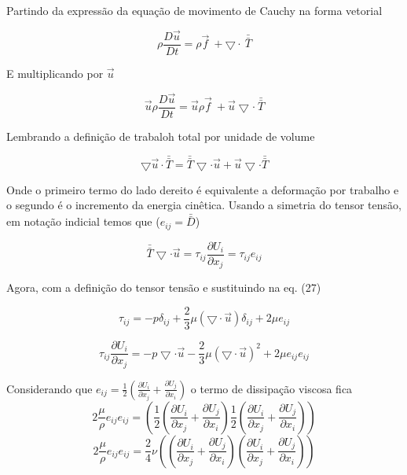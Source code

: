 \documentclass[12pt]{article}
\begin{document}
Partindo da expressão da equação de movimento de Cauchy na forma vetorial

\begin{equation}
	\rho \frac{D\vec{u}}{Dt} = \rho\vec{f} \ + \bigtriangledown \cdot \ \bar{\bar{T}} 
\end{equation}


E multiplicando por $\vec{u}$


\begin{equation}
	\vec{u}\rho \frac{D\vec{u}}{Dt} = \vec{u}\rho\vec{f} \ + \vec{u}\bigtriangledown \cdot \ \bar{\bar{T}} 
\end{equation}

Lembrando a definição de trabaloh total por unidade de volume


\begin{equation}
	\bigtriangledown \vec{u} \cdot \bar{\bar{T}} =  \bar{\bar{T}}  \bigtriangledown  \cdot \vec{u}  + \vec{u} \bigtriangledown  \cdot \bar{\bar{T}} 
\end{equation}

Onde o primeiro termo do lado dereito é equivalente a deformação por trabalho e o segundo é o incremento da energia cinêtica. Usando a simetria do tensor tensão, em notação indicial temos que ($e_{ij} = \bar{\bar{D}}$)

\begin{equation}
	 \bar{\bar{T}}  \bigtriangledown  \cdot \vec{u} =  \tau_{ij} \frac{\partial U_i}{\partial x_j} = \tau_{ij} e_{ij}
\end{equation}

Agora, com a definição do tensor tensão e sustituindo na eq. (27)

\begin{equation}
	\tau_{ij} =  -p\delta_{ij} + \frac{2}{3} \mu (\bigtriangledown \cdot \vec{u})\delta_{ij} + 2 \mu e_{ij}	
\end{equation}

\begin{equation}
	\tau_{ij} \frac{\partial U_i}{\partial x_j} = -p \bigtriangledown  \cdot \vec{u} - \frac{2}{3} \mu (\bigtriangledown \cdot \vec{u})^{2} + 2 \mu e_{ij}	e_{ij}
\end{equation}

Considerando que $e_{ij} = \frac{1}{2}\left( \frac{\partial U_i}{\partial x_j} + \frac{\partial U_j}{\partial x_i}\right) $ o termo de dissipação viscosa fica
\begin{equation}
	 2 \frac{\mu}{\rho} e_{ij}e_{ij} = \left( \frac{1}{2}\left( \frac{\partial U_i}{\partial x_j} + \frac{\partial U_j}{\partial x_i}\right)  \frac{1}{2}\left( \frac{\partial U_i}{\partial x_j} + \frac{\partial U_j}{\partial x_i}\right)  \right) 
\end{equation}
\begin{equation}
	2 \frac{\mu}{\rho} e_{ij}e_{ij} = \frac{2}{4} \nu\left( \left( \frac{\partial U_i}{\partial x_j} + \frac{\partial U_j}{\partial x_i}\right)  \left( \frac{\partial U_i}{\partial x_j} + \frac{\partial U_j}{\partial x_i}\right)  \right) 
\end{equation}
\end{document}
